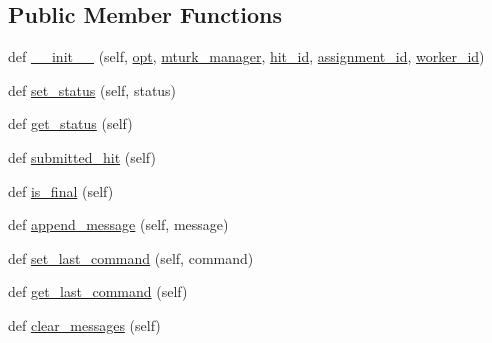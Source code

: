 \subsection*{Public Member Functions}
\begin{DoxyCompactItemize}
\item 
def \hyperlink{classparlai_1_1mturk_1_1core_1_1legacy__2018_1_1agents_1_1MTurkAgent_a87dcf45fff05aac86acf6d3dfbef9557}{\+\_\+\+\_\+init\+\_\+\+\_\+} (self, \hyperlink{classparlai_1_1core_1_1agents_1_1Agent_ab3b45d2754244608c75d4068b90cd051}{opt}, \hyperlink{classparlai_1_1mturk_1_1core_1_1legacy__2018_1_1agents_1_1MTurkAgent_a100fc20d4a3fc94d9316fecf7e6f3e8c}{mturk\+\_\+manager}, \hyperlink{classparlai_1_1mturk_1_1core_1_1legacy__2018_1_1agents_1_1MTurkAgent_aa9c6c8305c9b3346f9bb09c963625cfa}{hit\+\_\+id}, \hyperlink{classparlai_1_1mturk_1_1core_1_1legacy__2018_1_1agents_1_1MTurkAgent_a702599b137e9311c097bae12ef194007}{assignment\+\_\+id}, \hyperlink{classparlai_1_1mturk_1_1core_1_1legacy__2018_1_1agents_1_1MTurkAgent_ac42dbf666cfe12e9b64cb6d4076f9262}{worker\+\_\+id})
\item 
def \hyperlink{classparlai_1_1mturk_1_1core_1_1legacy__2018_1_1agents_1_1MTurkAgent_aba01d9584efeeefa0db8abd7c1f1092e}{set\+\_\+status} (self, status)
\item 
def \hyperlink{classparlai_1_1mturk_1_1core_1_1legacy__2018_1_1agents_1_1MTurkAgent_abb7463e1f56718d7faf6829a71f7d05a}{get\+\_\+status} (self)
\item 
def \hyperlink{classparlai_1_1mturk_1_1core_1_1legacy__2018_1_1agents_1_1MTurkAgent_a8f1e6f940081eab5ce329b106c61b294}{submitted\+\_\+hit} (self)
\item 
def \hyperlink{classparlai_1_1mturk_1_1core_1_1legacy__2018_1_1agents_1_1MTurkAgent_a45ac31e91fb1d40d2a4907e56e13cce6}{is\+\_\+final} (self)
\item 
def \hyperlink{classparlai_1_1mturk_1_1core_1_1legacy__2018_1_1agents_1_1MTurkAgent_ad63ff689204aff37de7c4fb3a6abb03b}{append\+\_\+message} (self, message)
\item 
def \hyperlink{classparlai_1_1mturk_1_1core_1_1legacy__2018_1_1agents_1_1MTurkAgent_aff10181ad4291bcab9fb1757751dd35e}{set\+\_\+last\+\_\+command} (self, command)
\item 
def \hyperlink{classparlai_1_1mturk_1_1core_1_1legacy__2018_1_1agents_1_1MTurkAgent_af74c2cb4a0eb7c1e7c9f57346b16bfbb}{get\+\_\+last\+\_\+command} (self)
\item 
def \hyperlink{classparlai_1_1mturk_1_1core_1_1legacy__2018_1_1agents_1_1MTurkAgent_a2b5555ed1e85ef49d26d38b177052eb1}{clear\+\_\+messages} (self)

\end{DoxyCompactItemize}
